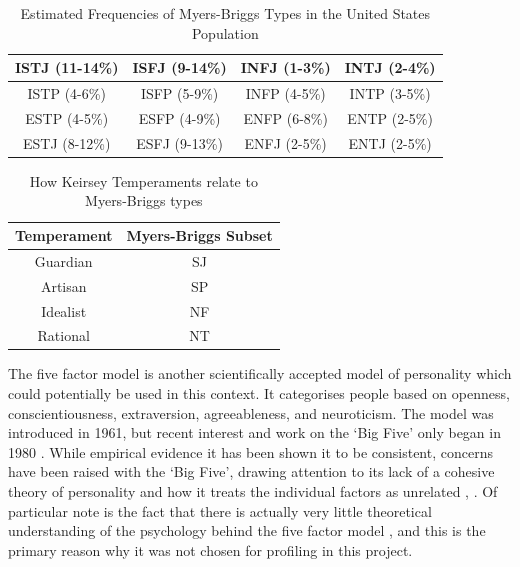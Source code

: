 \documentclass[12pt]{article}
\begin{document}
\begin{table}[p]
\begin{center}
\begin{tabular}{|c|c|c|c|}
	\hline ISTJ (11-14\%) & ISFJ (9-14\%) & INFJ (1-3\%) & INTJ (2-4\%) \\ 
	\hline ISTP (4-6\%) & ISFP (5-9\%) & INFP (4-5\%) & INTP (3-5\%) \\ 
	\hline ESTP (4-5\%) & ESFP (4-9\%) & ENFP (6-8\%) & ENTP (2-5\%) \\ 
	\hline ESTJ (8-12\%) & ESFJ (9-13\%) & ENFJ (2-5\%) & ENTJ (2-5\%) \\ 
	\hline 
\end{tabular}
\end{center}
\caption{Estimated Frequencies of Myers-Briggs Types in the United States Population \cite{mb-freq}}
\label{table:freq}
\end{table}

\begin{table}[p]
\begin{center}
	\begin{tabular}{|c|c|}
		\hline Temperament & Myers-Briggs Subset \\ 
		\hline Guardian & SJ \\ 
		\hline Artisan & SP \\ 
		\hline Idealist & NF \\ 
		\hline Rational & NT \\ 
		\hline 
	\end{tabular} 
\end{center}
\caption{How Keirsey Temperaments relate to Myers-Briggs types \cite{keirsey1998please}}
\label{table:map}
\end{table}

The five factor model is another scientifically accepted model of personality which could potentially be used in this context. It categorises people based on openness, conscientiousness, extraversion, agreeableness, and neuroticism. The model was introduced in 1961, but recent interest and work on the `Big Five' only began in 1980 \cite{wiki-ffm}. While empirical evidence it has been shown it to be consistent, concerns have been raised with the `Big Five', drawing attention to its lack of a cohesive theory of personality and how it treats the individual factors as unrelated \cite{block2010five}, \cite{eysenck1992four}. Of particular note is the fact that there is actually very little theoretical understanding of the psychology behind the five factor model \cite{eysenck1992four}, and this is the primary reason why it was not chosen for profiling in this project.
\end{document}
